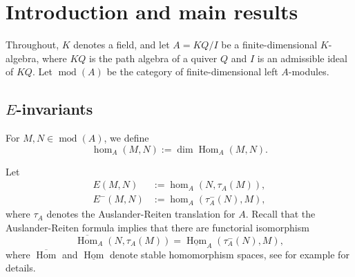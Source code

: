 \documentclass[12pt,reqno]{amsart}
\theoremstyle{definition}
\newcommand{\md}{\operatorname{mod}}
\newcommand{\Hom}{\operatorname{Hom}}
\newcommand{\ov}{\overline}
\begin{document}



\begin{abstract}
We introduce generalized Jacobian algebras and show that a 
finite-dimensional algebra is $E$-symmetric if and only if it is
generalized Jacobian.
We also characterize $E$-symmetric algebras in terms of its simple modules.
We show that 
Enomoto's counterexample to the Periodicity Conjecture 
is a generalized Jacobian algebra, which is not Jacobian in the classical sense.
\end{abstract}


\maketitle

\setcounter{tocdepth}{1}
\tableofcontents

\parskip2mm


\section{Introduction and main results}\label{sec:1}


Throughout, $K$ denotes a field, and let
$A = KQ/I$ be a finite-dimensional $K$-algebra, where $KQ$ is the path algebra of a quiver $Q$ and 
$I$ is an admissible ideal of $KQ$.
Let $\md(A)$ be the category of finite-dimensional left $A$-modules.

\subsection{$E$-invariants}

For $M,N \in \md(A)$, we define
$$
\hom_A(M,N) := \dim \Hom_A(M,N).
$$

Let
\begin{align*}
E(M,N) &:= \hom_A(N,\tau_A(M)),
\\
E^-(M,N) &:= \hom_A(\tau_A^{-}(N),M),
\end{align*}
where $\tau_A$ denotes the Auslander-Reiten translation for $A$.
Recall that the Auslander-Reiten formula implies that there are functorial
isomorphism
$$
\ov{\Hom}_A(N,\tau_A(M)) = \underline{\Hom}_A(\tau_A^{-}(N),M),
$$
where $\ov{\Hom}$ and $\underline{\Hom}$ denote stable homomorphism spaces, see for example \cite[Section~IV.4]{ARS97} for details.
\end{document}
